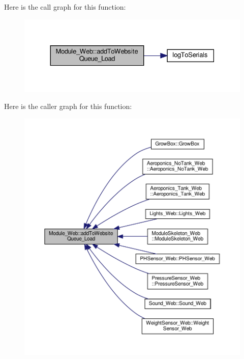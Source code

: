 Here is the call graph for this function\+:
\nopagebreak
\begin{figure}[H]
\begin{center}
\leavevmode
\includegraphics[width=330pt]{class_module___web_a11f84c9609ed88d1bfcd869d64775e93_cgraph}
\end{center}
\end{figure}
Here is the caller graph for this function\+:
\nopagebreak
\begin{figure}[H]
\begin{center}
\leavevmode
\includegraphics[width=350pt]{class_module___web_a11f84c9609ed88d1bfcd869d64775e93_icgraph}
\end{center}
\end{figure}
\mbox{\label{class_module___web_a11f84c9609ed88d1bfcd869d64775e93}} 
